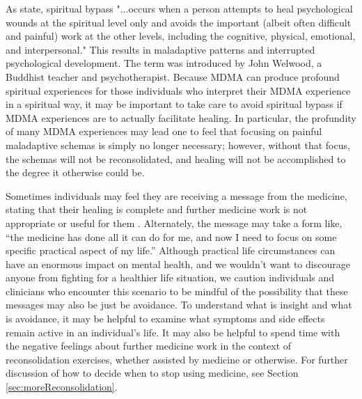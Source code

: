 \documentclass[12pt,letterpaper]{book}
\begin{document}
As \textcite{cashwell2007Bypass} state, spiritual bypass "...occurs when a person attempts to heal psychological wounds at the spiritual  level only and avoids the important (albeit often difficult and painful) work at the other levels, including the cognitive, physical, emotional, and interpersonal." This results in maladaptive patterns and interrupted psychological development. The term was introduced by John Welwood, a Buddhist teacher and psychotherapist. Because MDMA can produce profound spiritual experiences for those individuals who interpret their MDMA experience in a spiritual way, it may be important to take care to avoid spiritual bypass if MDMA experiences are to actually facilitate healing. In particular, the profundity of many MDMA experiences may lead one to feel that focusing on painful maladaptive schemas is simply no longer necessary; however, without that focus, the schemas will not be reconsolidated, and healing will not be accomplished to the degree it otherwise could be.

Sometimes individuals may feel they are receiving a message from the medicine, stating that their healing is complete and further medicine work is not appropriate or useful for them \cite{razviDissociation}. Alternately, the message may take a form like, “the medicine has done all it can do for me, and now I need to focus on some specific practical aspect of my life.” Although practical life circumstances can have an enormous impact on mental health, and we wouldn't want to discourage anyone from fighting for a healthier life situation, we caution individuals and clinicians who encounter this scenario to be mindful of the possibility that these messages may also be just be avoidance. To understand what is insight and what is avoidance, it may be helpful to examine what symptoms and side effects remain active in an individual's life. It may also be helpful to spend time with the negative feelings about further medicine work in the context of reconsolidation exercises, whether assisted by medicine or otherwise. For further discussion of how to decide when to stop using medicine, see Section \ref{sec:moreReconsolidation}.
\end{document}
